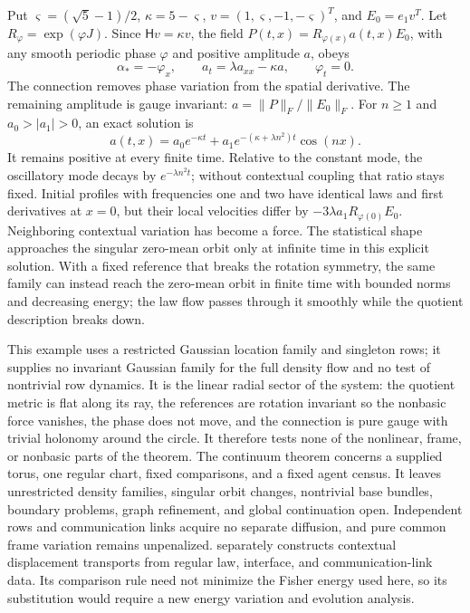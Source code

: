 Put $\varsigma=(\sqrt5-1)/2$, $\kappa=5-\varsigma$, $v=(1,\varsigma,-1,-\varsigma)^T$, and $E_0=e_1v^T$. Let $R_\varphi=\exp(\varphi J)$. Since $\mathsf Hv=\kappa v$, the field $P(t,x)=R_{\varphi(x)}a(t,x)E_0$, with any smooth periodic phase $\varphi$ and positive amplitude $a$, obeys
\begin{equation}
 \alpha_*=-\varphi_x,\qquad
 a_t=\lambda a_{xx}-\kappa a,\qquad \varphi_t=0.
 \label{comp:ctx:amplitude}
\end{equation}
The connection removes phase variation from the spatial derivative. The remaining amplitude is gauge invariant: $a=\|P\|_F/\|E_0\|_F$. For $n\geq1$ and $a_0>|a_1|>0$, an exact solution is
\begin{equation}
 a(t,x)=a_0e^{-\kappa t}
              +a_1e^{-(\kappa+\lambda n^2)t}\cos(nx).
 \label{comp:ctx:exact-amplitude}
\end{equation}
It remains positive at every finite time. Relative to the constant mode, the oscillatory mode decays by $e^{-\lambda n^2t}$; without contextual coupling that ratio stays fixed. Initial profiles with frequencies one and two have identical laws and first derivatives at $x=0$, but their local velocities differ by $-3\lambda a_1R_{\varphi(0)}E_0$. Neighboring contextual variation has become a force. The statistical shape approaches the singular zero-mean orbit only at infinite time in this explicit solution. With a fixed reference that breaks the rotation symmetry, the same family can instead reach the zero-mean orbit in finite time with bounded norms and decreasing energy; the law flow passes through it smoothly while the quotient description breaks down.

This example uses a restricted Gaussian location family and singleton rows; it supplies no invariant Gaussian family for the full density flow and no test of nontrivial row dynamics. It is the linear radial sector of the system: the quotient metric is flat along its ray, the references are rotation invariant so the nonbasic force vanishes, the phase does not move, and the connection is pure gauge with trivial holonomy around the circle. It therefore tests none of the nonlinear, frame, or nonbasic parts of the theorem. The continuum theorem concerns a supplied torus, one regular chart, fixed comparisons, and a fixed agent census. It leaves unrestricted density families, singular orbit changes, nontrivial base bundles, boundary problems, graph refinement, and global continuation open. Independent rows and communication links acquire no separate diffusion, and pure common frame variation remains unpenalized.  separately constructs contextual displacement transports from regular law, interface, and communication-link data. Its comparison rule need not minimize the Fisher energy used here, so its substitution would require a new energy variation and evolution analysis.
